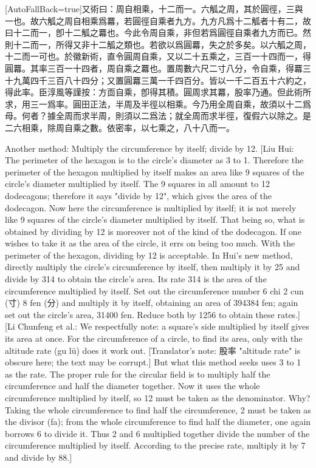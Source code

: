 \documentclass[11pt]{article}
\newcommand{\zhsmall}{\footnotesize\color{black!70}}
\newcommand{\unitlabel}[1]{\marginpar{\raggedleft\tiny\color{gray}#1}}
\newenvironment{unitzh}{\par\CJKfontspec{Noto Serif CJK SC}[AutoFallBack=true]\large\linespread{1.25}\selectfont}{\par}
\newenvironment{uniten}{\par\small\color{black!85}}{\par\medskip}
\begin{document}
\begin{unitzh}\unitlabel{jiuzhang-006.4}又術曰：周自相乘，十二而一。{\zhsmall 六觚之周，其於圓徑，三與一也。故六觚之周自相乘爲羃，若圓徑自乘者九方。九方凡爲十二觚者十有二，故曰十二而一，卽十二觚之羃也。今此令周自乘，非但若爲圓徑自乘者九方而已。然則十二而一，所得又非十二觚之類也。若欲以爲圓羃，失之於多矣。以六觚之周，十二而一可也。於徽新術，直令圓周自乘，又以二十五乘之，三百一十四而一，得圓羃。其率三百一十四者，周自乘之羃也。置周數六尺二寸八分，令自乘，得羃三十九萬四千三百八十四分；又置圓羃三萬一千四百分。皆以一千二百五十六約之，得此率。}{\zhsmall 臣淳風等謹按：方靣自乘，卽得其積。圓周求其羃，股率乃通。但此術所求，用三一爲率。圓田正法，半周及半徑以相乘。今乃用全周自乘，故須以十二爲母。何者？據全周而求半周，則須以二爲法；就全周而求半徑，復假六以除之。是二六相乘，除周自乘之數。依密率，以七乘之，八十八而一。}\end{unitzh}
\begin{uniten}Another method: Multiply the circumference by itself; divide by 12. [Liu Hui: The perimeter of the hexagon is to the circle's diameter as 3 to 1. Therefore the perimeter of the hexagon multiplied by itself makes an area like 9 squares of the circle's diameter multiplied by itself. The 9 squares in all amount to 12 dodecagons; therefore it says "divide by 12", which gives the area of the dodecagon. Now here the circumference is multiplied by itself; it is not merely like 9 squares of the circle's diameter multiplied by itself. That being so, what is obtained by dividing by 12 is moreover not of the kind of the dodecagon. If one wishes to take it as the area of the circle, it errs on being too much. With the perimeter of the hexagon, dividing by 12 is acceptable. In Hui's new method, directly multiply the circle's circumference by itself, then multiply it by 25 and divide by 314 to obtain the circle's area. Its rate 314 is the area of the circumference multiplied by itself. Set out the circumference number 6 chi 2 cun (寸) 8 fen (分) and multiply it by itself, obtaining an area of 394384 fen; again set out the circle's area, 31400 fen. Reduce both by 1256 to obtain these rates.] [Li Chunfeng et al.: We respectfully note: a square's side multiplied by itself gives its area at once. For the circumference of a circle, to find its area, only with the altitude rate (gu lü) does it work out. [Translator's note: 股率 "altitude rate" is obscure here; the text may be corrupt.] But what this method seeks uses 3 to 1 as the rate. The proper rule for the circular field is to multiply half the circumference and half the diameter together. Now it uses the whole circumference multiplied by itself, so 12 must be taken as the denominator. Why? Taking the whole circumference to find half the circumference, 2 must be taken as the divisor (fa); from the whole circumference to find half the diameter, one again borrows 6 to divide it. Thus 2 and 6 multiplied together divide the number of the circumference multiplied by itself. According to the precise rate, multiply it by 7 and divide by 88.]\end{uniten}
\end{document}
